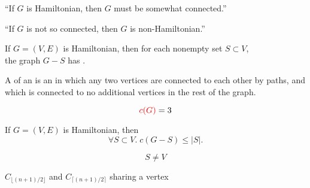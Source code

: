 
\begin{frame}{}
  \begin{center}
    ``If $G$ is Hamiltonian, then $G$ must be somewhat connected.''


    \pause
    ``If $G$ is not so connected, then $G$ is non-Hamiltonian.''
  \end{center}
\end{frame}

\begin{frame}{}
  \begin{theorem}{}
    If $G = (V, E)$ is Hamiltonian,
    then for each nonempty set $S \subset V$, \\[3pt]
    the graph $G - S$ has  .
  \end{theorem}
\end{frame}

\begin{frame}{}
  \begin{definition}
    A  of an 
    is an  in which any two vertices are connected to each other by paths,
    and which is connected to no additional vertices in the rest of the graph.
  \end{definition}

  \vspace{0.20cm}

  \pause
  \vspace{-0.20cm}
  \[
    \textcolor{red}{c(G)} = 3
  \]
\end{frame}

\begin{frame}{}
  \begin{theorem}{}
    If $G = (V, E)$ is Hamiltonian, then
    \[
      \forall S \subset V.\; c(G - S) \le |S|.
    \]
  \end{theorem}

  \pause
  \vspace{0.30cm}
  \[
    S \neq V
  \]

  \pause
  \vspace{0.30cm}
  \begin{center}
    $C_{\lfloor (n + 1)/ 2 \rfloor}$ and $C_{\lceil (n+1)/2 \rceil}$
    sharing a vertex
  \end{center}
\end{frame}

